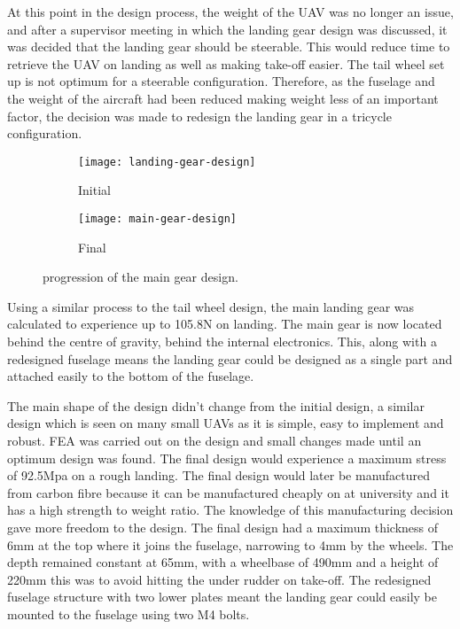\documentclass[../../main.tex]{subfiles}
\begin{document}
At this point in the design process, the weight of the UAV was no longer an issue, and after a supervisor meeting in which the landing gear design was discussed, it was decided that the landing gear should be steerable.
This would reduce time to retrieve the UAV on landing as well as making take-off easier.
The tail wheel set up is not optimum for a steerable configuration.
Therefore, as the fuselage and the weight of the aircraft had been reduced making weight less of an important factor, the decision was made to redesign the landing gear in a tricycle configuration. 

\begin{figure}[H]
    \centering
    \begin{subfigure}[b]{0.33\columnwidth}
        \centering
        \texttt{[image: landing-gear-design]}
        \caption{Initial}
        \label{fig:main-gear-progression:initial}
    \end{subfigure}
    \hfill
    \begin{subfigure}[b]{0.49\columnwidth}
        \centering
        \texttt{[image: main-gear-design]}
        \caption{Final}
        \label{fig:main-gear-progression:final}
    \end{subfigure}
    
    \caption{progression of the main gear design.}
    \label{fig:main-gear-progression}
\end{figure}

Using a similar process to the tail wheel design, the main landing gear was calculated to experience up to 105.8N on landing.
The main gear is now located behind the centre of gravity, behind the internal electronics.
This, along with a redesigned fuselage means the landing gear could be designed as a single part and attached easily to the bottom of the fuselage. 


The main shape of the design didn’t change from the initial design, a similar design which is seen on many small UAVs as it is simple, easy to implement and robust.
FEA was carried out on the design and small changes made until an optimum design was found.
The final design would experience a maximum stress of 92.5Mpa on a rough landing.
The final design would later be manufactured from carbon fibre because it can be manufactured cheaply on at university and it has a high strength to weight ratio.
The knowledge of this manufacturing decision gave more freedom to the design.
The final design had a maximum thickness of 6mm at the top where it joins the fuselage, narrowing to 4mm by the wheels.
The depth remained constant at 65mm, with a wheelbase of 490mm and a height of 220mm this was to avoid hitting the under rudder on take-off.
The redesigned fuselage structure with two lower plates meant the landing gear could easily be mounted to the fuselage using two M4 bolts. 
\end{document}
